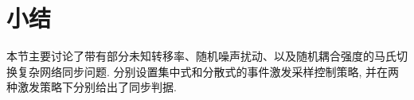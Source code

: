 \section{小结}
    本节主要讨论了带有部分未知转移率、随机噪声扰动、以及随机耦合强度的马氏切换复杂网络同步问题. 分别设置集中式和分散式的事件激发采样控制策略, 并在两种激发策略下分别给出了同步判据.
